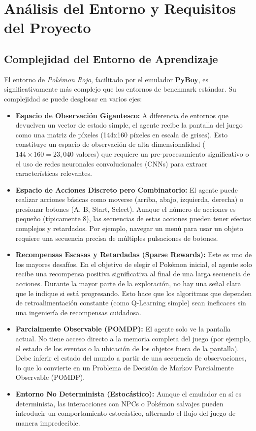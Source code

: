 \documentclass[12pt, oneside, openany]{book}
\begin{document}
\section{Análisis del Entorno y Requisitos del Proyecto}
\label{sec:analisis_entorno}

\subsection{Complejidad del Entorno de Aprendizaje}
El entorno de \textit{Pokémon Rojo}, facilitado por el emulador \textbf{PyBoy}, es significativamente más complejo que los entornos de benchmark estándar. Su complejidad se puede desglosar en varios ejes:

\begin{itemize}
    \item \textbf{Espacio de Observación Gigantesco:} A diferencia de entornos que devuelven un vector de estado simple, el agente recibe la pantalla del juego como una matriz de píxeles (144x160 píxeles en escala de grises). Esto constituye un espacio de observación de alta dimensionalidad ($144 \times 160 = 23,040$ valores) que requiere un pre-procesamiento significativo o el uso de redes neuronales convolucionales (CNNs) para extraer características relevantes.
    \item \textbf{Espacio de Acciones Discreto pero Combinatorio:} El agente puede realizar acciones básicas como moverse (arriba, abajo, izquierda, derecha) o presionar botones (A, B, Start, Select). Aunque el número de acciones es pequeño (típicamente 8), las secuencias de estas acciones pueden tener efectos complejos y retardados. Por ejemplo, navegar un menú para usar un objeto requiere una secuencia precisa de múltiples pulsaciones de botones.
    \item \textbf{Recompensas Escasas y Retardadas (Sparse Rewards):} Este es uno de los mayores desafíos. En el objetivo de elegir el Pokémon inicial, el agente solo recibe una recompensa positiva significativa al final de una larga secuencia de acciones. Durante la mayor parte de la exploración, no hay una señal clara que le indique si está progresando. Esto hace que los algoritmos que dependen de retroalimentación constante (como Q-Learning simple) sean ineficaces sin una ingeniería de recompensas cuidadosa.
    \item \textbf{Parcialmente Observable (POMDP):} El agente solo ve la pantalla actual. No tiene acceso directo a la memoria completa del juego (por ejemplo, el estado de los eventos o la ubicación de los objetos fuera de la pantalla). Debe inferir el estado del mundo a partir de una secuencia de observaciones, lo que lo convierte en un Problema de Decisión de Markov Parcialmente Observable (POMDP).
    \item \textbf{Entorno No Determinista (Estocástico):} Aunque el emulador en sí es determinista, las interacciones con NPCs o Pokémon salvajes pueden introducir un comportamiento estocástico, alterando el flujo del juego de manera impredecible.
\end{itemize}
\end{document}
